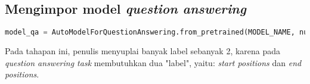 \subsection{Mengimpor model \emph{question answering}}
\begin{lstlisting}[language=Python, caption=Mengimpor model \emph{question answering}]
model_qa = AutoModelForQuestionAnswering.from_pretrained(MODEL_NAME, num_labels=2)
\end{lstlisting}

Pada tahapan ini, penulis menyuplai banyak label sebanyak 2, karena pada \emph{question answering task} membutuhkan dua "label", yaitu: \emph{start positions} dan \emph{end positions}.


